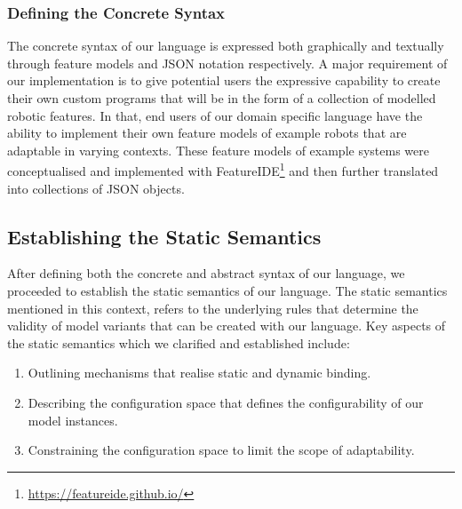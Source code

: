 \documentclass[conference]{IEEEtran}
\newcommand{\foot}[1]{\footnote{\url{#1}}}
\begin{document}
\subsubsection{Defining the Concrete Syntax}
The concrete syntax of our language is expressed both graphically and textually through feature models and JSON notation respectively. A major requirement of our implementation is to give potential users the expressive capability to create their own custom programs that will be in the form of a collection of modelled robotic features. In that, end users of our domain specific language have the ability to implement their own feature models of example robots that are adaptable in varying contexts. These feature models of example systems were conceptualised and implemented with FeatureIDE\foot{https://featureide.github.io/} and then further translated into collections of JSON objects.

\subsection{Establishing the Static Semantics}
After defining both the concrete and abstract syntax of our language, we proceeded to establish the static semantics of our language. The static semantics mentioned in this context, refers to the underlying rules that determine the validity of model variants that can be created with our language. Key aspects of the static semantics which we clarified and established include:
\begin{enumerate}
    \item Outlining mechanisms that realise static and dynamic binding.
    \item Describing the configuration space that defines the configurability of our model instances.
    \item Constraining the configuration space to limit the scope of adaptability.
\end{enumerate}
\end{document}

